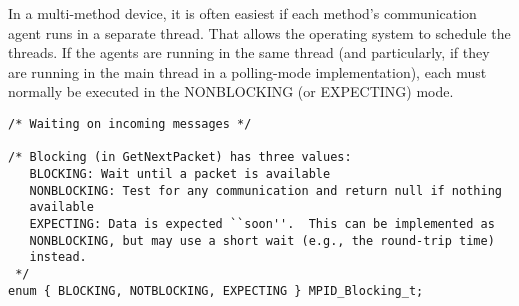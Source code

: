 In a multi-method device, it is often easiest if each method's communication 
agent runs in a separate thread.  That allows the operating system to 
schedule the threads.  If the agents are running in the same thread (and 
particularly, if they are running in the main thread in a polling-mode 
implementation), each must normally be executed in the NONBLOCKING (or 
EXPECTING) mode.

\begin{verbatim}
/* Waiting on incoming messages */

/* Blocking (in GetNextPacket) has three values:
   BLOCKING: Wait until a packet is available
   NONBLOCKING: Test for any communication and return null if nothing 
   available
   EXPECTING: Data is expected ``soon''.  This can be implemented as 
   NONBLOCKING, but may use a short wait (e.g., the round-trip time) 
   instead. 
 */
enum { BLOCKING, NOTBLOCKING, EXPECTING } MPID_Blocking_t;


\end{verbatim}
